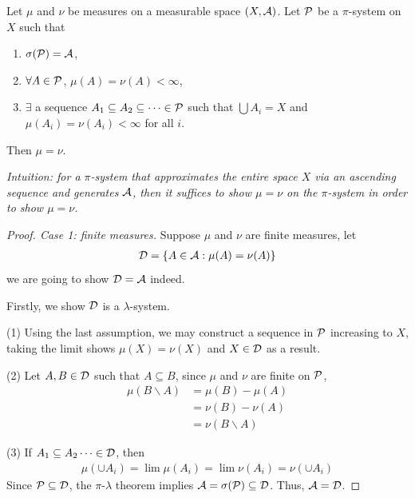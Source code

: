\documentclass[11pt]{article}
\begin{document}
	\begin{corollary}
		Let $\mu$ and $\nu$ be measures on a measurable space $(X, \mathcal{{A}})$. Let $\mathcal{{P}}$ be a $\pi$-system on $X$ such that
		\begin{enumerate}
			\item $\sigma(\mathcal{{P}}) = \mathcal{{A}}$,
			\item $\forall A \in \mathcal{{P}}$, $\mu(A) = \nu(A) < \infty$,
			\item $\exists$ a sequence $A_1 \subseteq A_2 \subseteq \dots \in \mathcal{{P}}$ such that $\bigcup A_i = X$ and $\mu(A_i) = \nu(A_i) < \infty$ for all $i$.
		\end{enumerate}
		Then $\mu = \nu$.
		
		\emph{Intuition: for a $\pi$-system that approximates the entire space $X$ via an ascending sequence and generates $\mathcal{{A}}$, then it suffices to show $\mu = \nu$ on the $\pi$-system in order to show $\mu = \nu$.}
	\end{corollary}
	\begin{proof}[Proof. Case 1: finite measures]
		Suppose $\mu$ and $\nu$ are finite measures, let
		\begin{align}
			\mathcal{{D}} = \{A \in \mathcal{{A}}: \mu(A) = \nu(A)\}
		\end{align}
		we are going to show $\mathcal{{D}} = \mathcal{{A}}$ indeed.
		
		Firstly, we show $\mathcal{{D}}$ is a $\lambda$-system.
		
		(1) Using the last assumption, we may construct a sequence in $\mathcal{{P}}$ increasing to $X$, taking the limit shows $\mu(X) = \nu(X)$ and $X \in \mathcal{{D}}$ as a result.
		
		(2) Let $A, B \in \mathcal{{D}}$ such that $A \subseteq B$, since $\mu$ and $\nu$ are finite on $\mathcal{{P}}$,
		\begin{align}
			\mu(B \backslash A) &= \mu(B) - \mu(A) \\
			&= \nu(B) - \nu(A) \\
			&= \nu(B \backslash A)
		\end{align}
		
		(3) If $A_1 \subseteq A_2 \dots \in \mathcal{{D}}$, then
		\begin{align}
			\mu(\cup A_i) = \lim \mu(A_i) = \lim \nu(A_i) = \nu(\cup A_i)
		\end{align}
		Since $\mathcal{{P}} \subseteq \mathcal{{D}}$, the $\pi$-$\lambda$ theorem implies $\mathcal{{A}} = \sigma(\mathcal{{P}}) \subseteq \mathcal{{D}}$. Thus, $\mathcal{{A}} = \mathcal{{D}}$.
	\end{proof}
\end{document}

